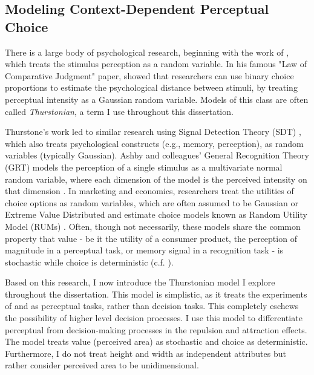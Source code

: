 \subsection{Modeling Context-Dependent Perceptual Choice}

There is a large body of psychological research, beginning with the work of \textcite{thurstone1927law}, which treats the stimulus perception as a random variable. In his famous "Law of Comparative Judgment" paper, \textcite{thurstone1927law} showed that researchers can use binary choice proportions to estimate the psychological distance between stimuli, by treating perceptual intensity as a Gaussian random variable. Models of this class are often called \textit{Thurstonian}, a term I use throughout this dissertation. 

Thurstone's work led to similar research using Signal Detection Theory (SDT) \parencite{hautus2021detection}, which also treats psychological constructs (e.g., memory, perception), as random variables (typically Gaussian). Ashby and colleagues' General Recognition Theory (GRT) models the perception of a single stimulus as a multivariate normal random variable, where each dimension of the model is the perceived intensity on that dimension \parencite{ashbyVarietiesPerceptualIndependence1986a,ashby1988decision, ashbyUnifiedTheorySimilarity,maddoxComparingDecisionBound1993}. In marketing and economics, researchers treat the utilities of choice options as random variables, which are often assumed to be Gaussian or Extreme Value Distributed and estimate choice models known as Random Utility Model (RUMs) \parencite{mcfadden2001economic,hausman1978conditional,train2009discrete}. Often, though not necessarily, these models share the common property that value - be it the utility of a consumer product, the perception of magnitude in a perceptual task, or memory signal in a recognition task - is stochastic while choice is deterministic  (c.f. \textcite{benjamin2009signal}).

Based on this research, I now introduce the Thurstonian model I explore throughout the dissertation. This model is simplistic, as it treats the experiments of \textcite{trueblood2013not} and \textcite{spektorWhenGoodLooks2018b} as perceptual tasks, rather than decision tasks. This completely eschews the possibility of higher level decision processes. I use this model to differentiate perceptual from decision-making processes in the repulsion and attraction effects. The model treats value (perceived area) as stochastic and choice as deterministic. Furthermore, I do not treat height and width as independent attributes but rather consider perceived area to be unidimensional. 


